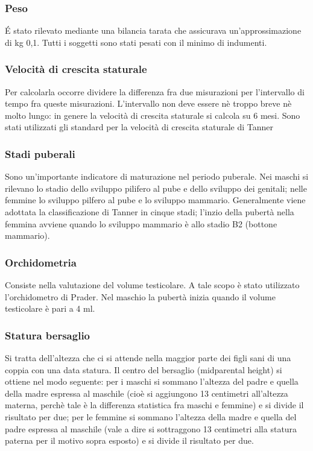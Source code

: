   
\subsubsection*{Peso}
 \'E stato rilevato mediante una bilancia tarata che assicurava un'approssimazione di kg 0,1. Tutti i soggetti sono stati pesati con il minimo di indumenti.

\subsubsection*{Velocità di crescita staturale}
Per calcolarla occorre dividere la differenza fra due misurazioni per l'intervallo di tempo fra queste misurazioni. L'intervallo non deve essere nè troppo breve nè molto lungo: in genere la velocità di crescita staturale si calcola su 6 mesi. Sono stati utilizzati gli standard per la velocità di crescita staturale di Tanner%

\subsubsection*{Stadi puberali}
Sono un'importante indicatore di maturazione nel periodo puberale. Nei maschi si rilevano lo stadio dello sviluppo pilifero al pube e dello sviluppo dei genitali; nelle femmine lo sviluppo pilfero al pube e lo sviluppo mammario. Generalmente viene adottata la classificazione di Tanner\cite{tanner1990foetus} in cinque stadi; l'inzio della pubertà nella femmina avviene quando lo sviluppo mammario è allo stadio B2 (bottone mammario). 

\subsubsection*{Orchidometria}
Consiste nella valutazione del volume testicolare. A tale scopo è stato utilizzato l'orchidometro di Prader. Nel maschio la pubertà inizia quando il volume testicolare è pari a 4 ml.  


\subsubsection*{Statura bersaglio}
Si tratta dell'altezza che ci si attende nella maggior parte dei figli sani di una coppia con una data statura. Il centro del bersaglio (midparental height) si ottiene nel modo seguente: per i maschi si sommano l'altezza del padre e quella della madre espressa al maschile (cioè si aggiungono 13 centimetri all'altezza materna, perchè tale è la differenza statistica fra maschi e femmine) e si divide il risultato per due; per le femmine si sommano l'altezza della madre e quella del padre espressa al maschile (vale a dire si sottraggono 13 centimetri alla statura paterna per il motivo sopra esposto) e si divide il risultato per due. 

